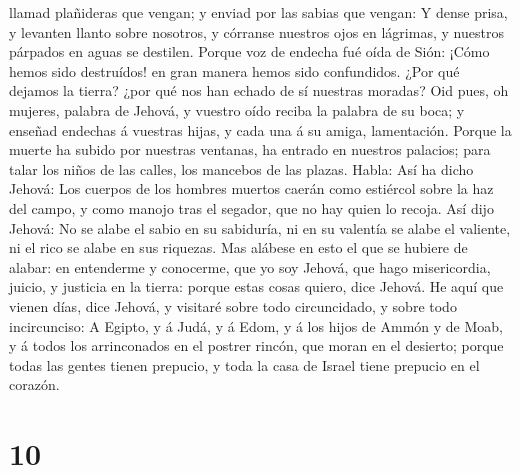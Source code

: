llamad plañideras que vengan; y enviad por las sabias que vengan:
 Y dense prisa, y levanten llanto sobre nosotros, y
córranse nuestros ojos en lágrimas, y nuestros párpados en aguas se
destilen.  Porque voz de endecha fué oída de Sión: ¡Cómo
hemos sido destruídos! en gran manera hemos sido confundidos. ¿Por qué
dejamos la tierra? ¿por qué nos han echado de sí nuestras moradas?
 Oid pues, oh mujeres, palabra de Jehová, y vuestro oído
reciba la palabra de su boca; y enseñad endechas á vuestras hijas, y
cada una á su amiga, lamentación.  Porque la muerte ha
subido por nuestras ventanas, ha entrado en nuestros palacios; para
talar los niños de las calles, los mancebos de las plazas.
 Habla: Así ha dicho Jehová: Los cuerpos de los hombres
muertos caerán como estiércol sobre la haz del campo, y como manojo tras
el segador, que no hay quien lo recoja.  Así dijo Jehová:
No se alabe el sabio en su sabiduría, ni en su valentía se alabe el
valiente, ni el rico se alabe en sus riquezas.  Mas
alábese en esto el que se hubiere de alabar: en entenderme y conocerme,
que yo soy Jehová, que hago misericordia, juicio, y justicia en la
tierra: porque estas cosas quiero, dice Jehová.  He aquí
que vienen días, dice Jehová, y visitaré sobre todo circuncidado, y
sobre todo incircunciso:  A Egipto, y á Judá, y á Edom, y
á los hijos de Ammón y de Moab, y á todos los arrinconados en el postrer
rincón, que moran en el desierto; porque todas las gentes tienen
prepucio, y toda la casa de Israel tiene prepucio en el corazón.

\hypertarget{section-9}{%
\section{10}\label{section-9}}


